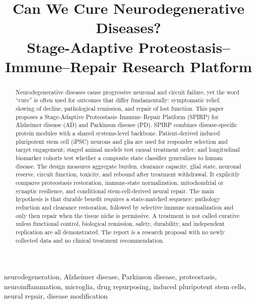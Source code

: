 \documentclass[conference]{IEEEtran}
\begin{document}
\title{Can We Cure Neurodegenerative Diseases?\\
Stage-Adaptive Proteostasis--Immune--Repair Research Platform}

\author{
}

\maketitle

\begin{abstract}
Neurodegenerative diseases cause progressive neuronal and circuit failure, yet the word ``cure'' is often used for outcomes that differ fundamentally: symptomatic relief, slowing of decline, pathological remission, and repair of lost function. This paper proposes a Stage-Adaptive Proteostasis--Immune--Repair Platform (SPIRP) for Alzheimer disease (AD) and Parkinson disease (PD). SPIRP combines disease-specific protein modules with a shared systems-level backbone. Patient-derived induced pluripotent stem cell (iPSC) neurons and glia are used for responder selection and target engagement; staged animal models test causal treatment order; and longitudinal biomarker cohorts test whether a composite state classifier generalizes to human disease. The design measures aggregate burden, clearance capacity, glial state, neuronal reserve, circuit function, toxicity, and rebound after treatment withdrawal. It explicitly compares proteostasis restoration, immune-state normalization, mitochondrial or synaptic resilience, and conditional stem-cell-derived neural repair. The main hypothesis is that durable benefit requires a state-matched sequence: pathology reduction and clearance restoration, followed by selective immune normalization and only then repair when the tissue niche is permissive. A treatment is not called curative unless functional control, biological remission, safety, durability, and independent replication are all demonstrated. The report is a research proposal with no newly collected data and no clinical treatment recommendation.
\end{abstract}

\begin{IEEEkeywords}
neurodegeneration, Alzheimer disease, Parkinson disease, proteostasis, neuroinflammation, microglia, drug repurposing, induced pluripotent stem cells, neural repair, disease modification
\end{IEEEkeywords}
\end{document}
